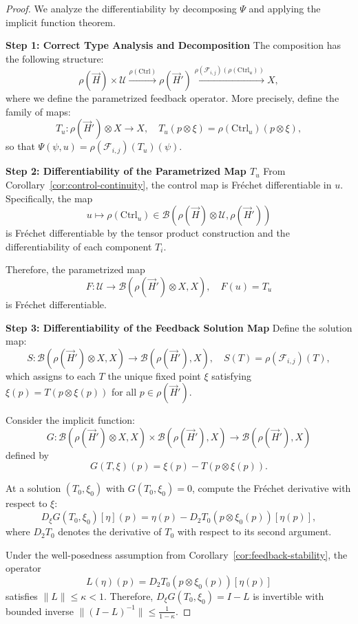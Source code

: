 \documentclass[11pt]{article}
\begin{document}
\begin{proof}
We analyze the differentiability by decomposing \(\Psi\) and applying the implicit function theorem.

\medskip
\noindent\textbf{Step 1: Correct Type Analysis and Decomposition}
The composition has the following structure:
\[
\rho(\vec{H}) \times \mathcal{U} 
\xrightarrow{\rho(\mathrm{Ctrl})} 
\rho(\vec{H}')
\xrightarrow{\rho(\mathcal{F}_{i,j})(\rho(\mathrm{Ctrl}_u))} 
X,
\]
where we define the parametrized feedback operator. More precisely, define the family of maps:
\[
T_u: \rho(\vec{H}') \otimes X \to X, \quad T_u(p \otimes \xi) = \rho(\mathrm{Ctrl}_u)(p \otimes \xi),
\]
so that \(\Psi(\psi, u) = \rho(\mathcal{F}_{i,j})(T_u)(\psi)\).

\medskip
\noindent\textbf{Step 2: Differentiability of the Parametrized Map \(T_u\)}
From Corollary~\ref{cor:control-continuity}, the control map is Fr\'echet differentiable in \(u\). Specifically, the map
\[
u \mapsto \rho(\mathrm{Ctrl}_u) \in \mathcal{B}(\rho(\vec{H}) \otimes \mathcal{U}, \rho(\vec{H}'))
\]
is Fr\'echet differentiable by the tensor product construction and the differentiability of each component \(T_i\).

Therefore, the parametrized map
\[
F: \mathcal{U} \to \mathcal{B}(\rho(\vec{H}') \otimes X, X), \quad F(u) = T_u
\]
is Fr\'echet differentiable.

\medskip
\noindent\textbf{Step 3: Differentiability of the Feedback Solution Map}
Define the solution map:
\[
S: \mathcal{B}(\rho(\vec{H}') \otimes X, X) \to \mathcal{B}(\rho(\vec{H}'), X), \quad S(T) = \rho(\mathcal{F}_{i,j})(T),
\]
which assigns to each \(T\) the unique fixed point \(\xi\) satisfying \(\xi(p) = T(p \otimes \xi(p))\) for all \(p \in \rho(\vec{H}')\).

Consider the implicit function:
\[
G: \mathcal{B}(\rho(\vec{H}') \otimes X, X) \times \mathcal{B}(\rho(\vec{H}'), X) \to \mathcal{B}(\rho(\vec{H}'), X)
\]
defined by
\[
G(T, \xi)(p) = \xi(p) - T(p \otimes \xi(p)).
\]

At a solution \((T_0, \xi_0)\) with \(G(T_0, \xi_0) = 0\), compute the Fr\'echet derivative with respect to \(\xi\):
\[
D_\xi G(T_0, \xi_0)[\eta](p) = \eta(p) - D_2T_0(p \otimes \xi_0(p))[\eta(p)],
\]
where \(D_2T_0\) denotes the derivative of \(T_0\) with respect to its second argument.

Under the well-posedness assumption from Corollary~\ref{cor:feedback-stability}, the operator
\[
L(\eta)(p) = D_2T_0(p \otimes \xi_0(p))[\eta(p)]
\]
satisfies \(\|L\| \le \kappa < 1\). Therefore, \(D_\xi G(T_0, \xi_0) = I - L\) is invertible with bounded inverse \(\|(I - L)^{-1}\| \le \frac{1}{1 - \kappa}\).


\end{proof}
\end{document}

